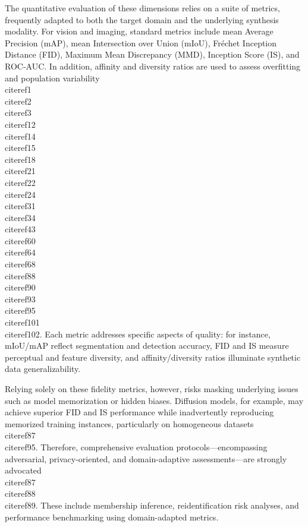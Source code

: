 \documentclass[11pt]{article}
\begin{document}
The quantitative evaluation of these dimensions relies on a suite of metrics, frequently adapted to both the target domain and the underlying synthesis modality. For vision and imaging, standard metrics include mean Average Precision (mAP), mean Intersection over Union (mIoU), Fréchet Inception Distance (FID), Maximum Mean Discrepancy (MMD), Inception Score (IS), and ROC-AUC. In addition, affinity and diversity ratios are used to assess overfitting and population variability \\cite{ref1}\\cite{ref2}\\cite{ref3}\\cite{ref12}\\cite{ref14}\\cite{ref15}\\cite{ref18}\\cite{ref21}\\cite{ref22}\\cite{ref24}\\cite{ref31}\\cite{ref34}\\cite{ref43}\\cite{ref60}\\cite{ref64}\\cite{ref68}\\cite{ref88}\\cite{ref90}\\cite{ref93}\\cite{ref95}\\cite{ref101}\\cite{ref102}. Each metric addresses specific aspects of quality: for instance, mIoU/mAP reflect segmentation and detection accuracy, FID and IS measure perceptual and feature diversity, and affinity/diversity ratios illuminate synthetic data generalizability.

Relying solely on these fidelity metrics, however, risks masking underlying issues such as model memorization or hidden biases. Diffusion models, for example, may achieve superior FID and IS performance while inadvertently reproducing memorized training instances, particularly on homogeneous datasets \\cite{ref87}\\cite{ref95}. Therefore, comprehensive evaluation protocols—encompassing adversarial, privacy-oriented, and domain-adaptive assessments—are strongly advocated \\cite{ref87}\\cite{ref88}\\cite{ref89}. These include membership inference, reidentification risk analyses, and performance benchmarking using domain-adapted metrics.
\end{document}
